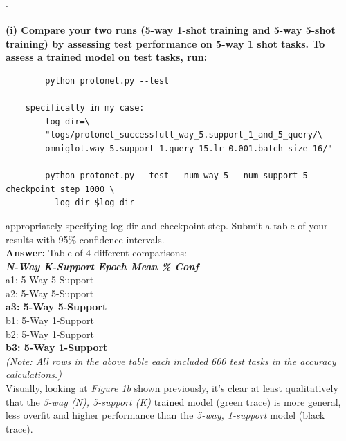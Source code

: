 \begin{answer}
.
    \\
    \large
    \\
    \textbf{(i) Compare your two runs (5-way 1-shot training and 5-way 5-shot training) by assessing test performance on 5-way 1 shot tasks. To assess a trained model on test tasks, run:
    }
    \begin{verbatim}
        python protonet.py --test
    
    specifically in my case: 
        log_dir=\
        "logs/protonet_successfull_way_5.support_1_and_5_query/\
        omniglot.way_5.support_1.query_15.lr_0.001.batch_size_16/"
    
        python protonet.py --test --num_way 5 --num_support 5 --checkpoint_step 1000 \
        --log_dir $log_dir
    \end{verbatim}
    
    appropriately specifying log dir and checkpoint step. Submit a table of your results with 95\% confidence intervals.
    \normalsize
    \\
    
    \textbf{Answer:} Table of 4 different comparisons:
    \\
    
    \textbf{\textit{N-Way K-Support \quad \quad \quad Epoch \quad Mean \% Conf}}
    \\
    a1: 5-Way 5-Support \quad \quad {} \quad \quad {} 
    \\
    a2: 5-Way 5-Support \quad \quad {} \quad {} 
    \\
    \textbf{a3: 5-Way 5-Support \quad {} \quad {} }
    \\
    
    b1: 5-Way 1-Support \quad \quad \quad 0 \quad \quad \quad 0.585 \quad 0.009
    \\
    b2: 5-Way 1-Support \quad \quad {} \quad {} 
    \\
    \textbf{b3: 5-Way 1-Support \quad {} \quad {} }
    \\
    \textit{(Note: All rows in the above table each included 600 test tasks in the accuracy calculations.)}
    \\
    
    Visually, looking at \textit{Figure 1b} shown previously, it's clear at least qualitatively that the \textit{5-way (N), 5-support (K)} trained model (green trace) is more general, less overfit and higher performance than the \textit{5-way, 1-support} model (black trace).
    \\
    

\end{answer}
